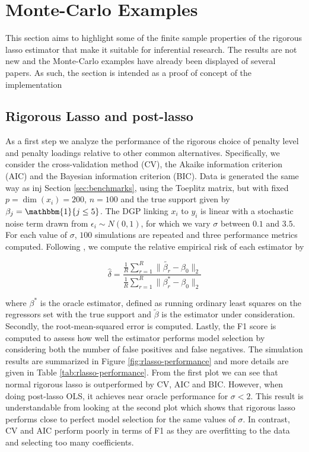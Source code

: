 \documentclass[11pt, reqno]{amsart} \usepackage{pstricks} %
\begin{document}
\section{Monte-Carlo Examples}

This section aims to highlight some of the finite sample properties of the
rigorous lasso estimator that make it suitable for inferential research. The
results are not new and the Monte-Carlo examples have already been displayed of
several papers. As such, the section is intended as a proof of concept of the
implementation 

\subsection{Rigorous Lasso and post-lasso} As a first step we analyze the
performance of the rigorous choice of penalty level and penalty loadings
relative to other common alternatives. Specifically, we consider the
cross-validation method (CV), the Akaike information criterion (AIC) and the
Bayesian information criterion (BIC). Data is generated the same way as inj
Section \ref{sec:benchmarks}, using the Toeplitz matrix, but with fixed $p =
\dim(x_i) = 200$, $n=100$ and the true support given by $\beta_j = \mathbbm{1}\{j
\leq 5\}$. The DGP linking $x_i$ to $y_i$ is linear with a stochastic noise
term drawn from $\epsilon_i \sim N(0, 1)$, for which we vary $\sigma$ between $0.1$
and $3.5$. For each value of $\sigma$, $100$ simulations are repeated and three
performance metrics computed. Following \cite{Belloni2011}, we compute the
relative empirical risk of each estimator by 

\begin{equation}
\label{eq:empirical risk}
\hat{\delta} = \frac{ \frac{1}{R} \sum_{r=1}^{R} \lVert \tilde{\beta_{r}} -
\beta_0 \rVert_2 }
{\frac{1}{R} \sum_{r=1}^{R} \lVert {\beta_{r}^{*}} -
\beta_0 \rVert_2 }
\end{equation}

\noindent where $\beta^*$ is the oracle estimator, defined as running ordinary
least squares on the regressors set with the true support and $\tilde{\beta}$
is the estimator under consideration. Secondly, the root-mean-squared error is
computed. Lastly, the F1 score is computed to assess how well the estimator
performs model selection by considering both the number of false positives and
false negatives. The simulation results are summarized in Figure
\ref{fig:rlasso-performance} and more details are given in Table
\ref{tab:rlasso-performance}. From the first plot we can see that normal
rigorous lasso is outperformed by CV, AIC and BIC. However, when doing
post-lasso OLS, it achieves near oracle performance for $\sigma < 2$. This
result is understandable from looking at the second plot which shows that
rigorous lasso performs close to perfect model selection for the same values of
$\sigma$. In contrast, CV and AIC perform poorly in terms of F1 as they are
overfitting to the data and selecting too many coefficients.
\end{document}
